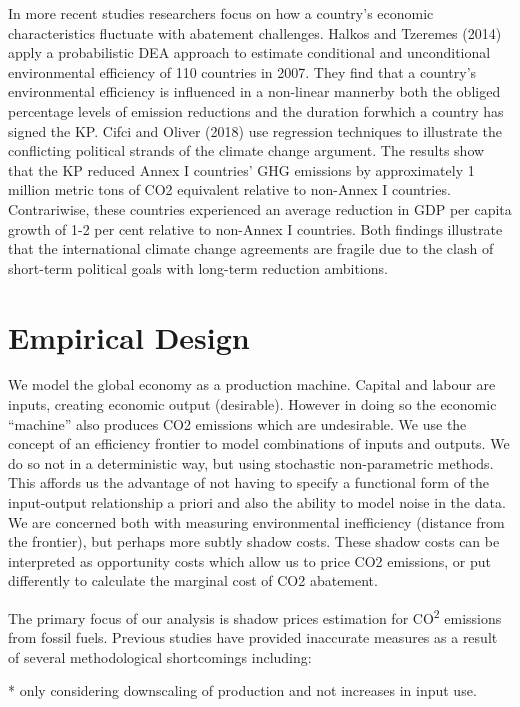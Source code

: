 \documentclass[
  letterpaper,
  DIV=11,
  numbers=noendperiod]{scrartcl}
\begin{document}
In more recent studies researchers focus on how a country's economic
characteristics fluctuate with abatement challenges. Halkos and Tzeremes
(2014) apply a probabilistic DEA approach to estimate conditional and
unconditional environmental efficiency of 110 countries in 2007. They
find that a country's environmental efficiency is influenced in a
non-linear mannerby both the obliged percentage levels of emission
reductions and the duration forwhich a country has signed the KP. Cifci
and Oliver (2018) use regression techniques to illustrate the
conflicting political strands of the climate change argument. The
results show that the KP reduced Annex I countries' GHG emissions by
approximately 1 million metric tons of CO2 equivalent relative to
non-Annex I countries. Contrariwise, these countries experienced an
average reduction in GDP per capita growth of 1-2 per cent relative to
non-Annex I countries. Both findings illustrate that the international
climate change agreements are fragile due to the clash of short-term
political goals with long-term reduction ambitions.

\hypertarget{empirical-design}{%
\section{Empirical Design}\label{empirical-design}}

We model the global economy as a production machine. Capital and labour
are inputs, creating economic output (desirable). However in doing so
the economic ``machine'' also produces CO2 emissions which are
undesirable. We use the concept of an efficiency frontier to model
combinations of inputs and outputs. We do so not in a deterministic way,
but using stochastic non-parametric methods. This affords us the
advantage of not having to specify a functional form of the input-output
relationship a priori and also the ability to model noise in the data.
We are concerned both with measuring environmental inefficiency
(distance from the frontier), but perhaps more subtly shadow costs.
These shadow costs can be interpreted as opportunity costs which allow
us to price CO2 emissions, or put differently to calculate the marginal
cost of CO2 abatement.

The primary focus of our analysis is shadow prices estimation for
CO\textsuperscript{2} emissions from fossil fuels. Previous studies have
provided inaccurate measures as a result of several methodological
shortcomings including:

* only considering downscaling of production and not increases in input
use.
\end{document}
